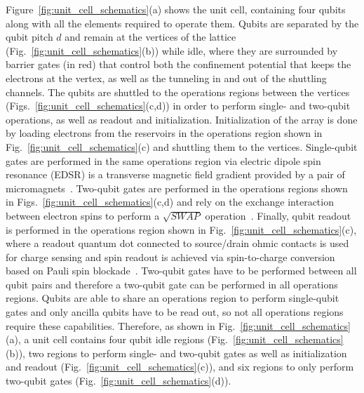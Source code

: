 \documentclass[aps,prl,reprint,superscriptaddress,floatfix]{revtex4-1}
\begin{document}
Figure~\ref{fig:unit_cell_schematics}(a) shows the unit cell, containing four qubits along with all the elements required to operate them.
Qubits are separated by the qubit pitch $d$ and remain at the vertices of the lattice (Fig.~\ref{fig:unit_cell_schematics}(b)) while idle, where they are surrounded by barrier gates (in red) that control both the confinement potential that keeps the electrons at the vertex, as well as the tunneling in and out of the shuttling channels.
The qubits are shuttled to the operations regions between the vertices (Figs.~\ref{fig:unit_cell_schematics}(c,d)) in order to perform single- and two-qubit operations, as well as readout and initialization.
Initialization of the array is done by loading electrons from the reservoirs in the operations region shown in Fig.~\ref{fig:unit_cell_schematics}(c) and shuttling them to the vertices.
Single-qubit gates are performed in the same operations region via electric dipole spin resonance (EDSR) is a transverse magnetic field gradient provided by a pair of micromagnets~\cite{Pioro-Ladriere2007}.
Two-qubit gates are performed in the operations regions shown in Figs.~\ref{fig:unit_cell_schematics}(c,d) and rely on the exchange interaction between electron spins to perform a $\sqrt{SWAP}$ operation~\cite{Loss1998,Divincenzo2000,Nielsen2016}.
Finally, qubit readout is performed in the operations region shown in Fig.~\ref{fig:unit_cell_schematics}(c), where a readout quantum dot connected to source/drain ohmic contacts is used for charge sensing and spin readout is achieved via spin-to-charge conversion based on Pauli spin blockade~\cite{Zwanenburg2013}.
Two-qubit gates have to be performed between all qubit pairs and therefore a two-qubit gate can be performed in all operations regions.
Qubits are able to share an operations region to perform single-qubit gates and only ancilla qubits have to be read out, so not all operations regions require these capabilities.
Therefore, as shown in Fig.~\ref{fig:unit_cell_schematics}(a), a unit cell contains four qubit idle regions (Fig.~\ref{fig:unit_cell_schematics}(b)), two regions to perform single- and two-qubit gates as well as initialization and readout (Fig.~\ref{fig:unit_cell_schematics}(c)), and six regions to only perform two-qubit gates (Fig.~\ref{fig:unit_cell_schematics}(d)).

\end{document}
